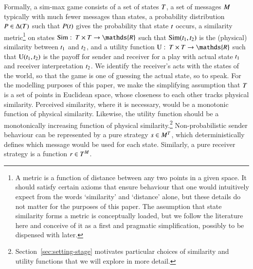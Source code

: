 \documentclass[11pt,english]{article}
\newcommand{\similarity}{\ensuremath{\mathrm{Sim}}} %
\renewcommand{\Pr}{\ensuremath{P}}
\numberwithin{equation}{section}
\begin{document}
Formally, a sim-max game consists of a set of states $T$, a set of messages $M$
typically with much fewer messages than states, a probability distribution
$\Pr \in \Delta(\States)$ such that $\Pr(\state)$ gives the probability that state $t$
occurs, a similarity metric\footnote{A metric is a function of distance between any two points
  in a given space. It should satisfy certain axioms that ensure behaviour that one would
  intuitively expect from the words `similarity' and `distance' alone, but these details do
  not matter for the purposes of this paper. The assumption that state similarity forms a
  metric is conceptually loaded, but we follow the literature here and conceive of it as a
  first and pragmatic simplification, possibly to be dispensed with later.}
on states $\similarity \mycolon \States \times \States \rightarrow \mathds{R}$ such that
$\similarity(\mystate{1}, \mystate{2})$ is the (physical) similarity between $t_{\mathrm{1}}$ and
$t_{\mathrm{2}}$, and a utility function
$\Utils \mycolon \States \times \States \rightarrow \mathds{R}$ such that
$\mathrm{U}(t_{\mathrm{1}}, t_{\mathrm{2}})$ is the payoff for sender and receiver for a play with actual
state $t_{\mathrm{1}}$ and receiver interpretation $t_{\mathrm{2}}$. We identify the receiver's acts
with the states of the world, so that the game is one of guessing the actual state, so to
speak. For the modelling purposes of this paper, we make the simplifying assumption that
$T$ is a set of points in Euclidean space, whose closeness to each other tracks physical
similarity. Perceived similarity, where it is necessary, would be a monotonic function of
physical similarity. Likewise, the utility function should be a monotonically increasing
function of physical similarity.\footnote{Section~\ref{sec:setting-stage} motivates particular
  choices of similarity and utility functions that we will explore in more detail.}
Non-probabilistic sender behaviour can be represented by a pure strategy
$s \in M^T$, which deterministically defines which message would be used for
each state. Similarly, a pure receiver strategy is a function $r \in T^M$.
\end{document}
